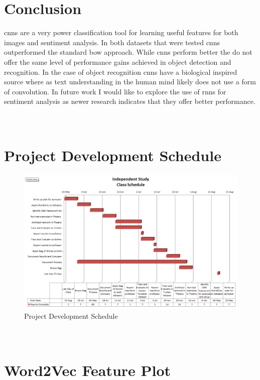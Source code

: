 \documentclass[12pt]{article}
\begin{document}


\section {Conclusion}
\ac{cnn}s are a very power classification tool for learning useful features for both images and sentiment analysis. In both datasets that were tested \ac{cnn}s outperformed the standard \ac{bow} approach. While \ac{cnn}s perform better the do not offer the same level of performance gains achieved in object detection and recognition. In the case of object recognition \ac{cnn}s have a biological inspired source where as text understanding in the human mind likely does not use a form of convolution. In future work I would like to explore the use of \ac{rnn}s for sentiment analysis as newer research indicates that they offer better performance. 

\newpage
\appendix
\section{\\Project Development Schedule} \label{App:AppendixA}
\begin{figure}[htbp!]
	\centering
	\includegraphics[scale=.5]{gantt.PNG}
	\caption{Project Development Schedule}
\end{figure}

\newpage
\section{\\Word2Vec Feature Plot} \label{App:AppendixB}
\end{document}

